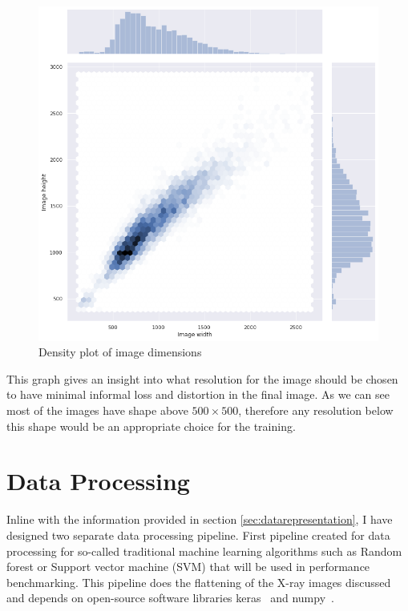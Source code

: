 \begin{figure}[H]
    \centering
    \includegraphics[width=\textwidth]{img/image_dims_density.png}
    \caption{Density plot of image dimensions}
    \label{fig:imagedimensions}
\end{figure}

This graph gives an insight into what resolution for the image should be chosen to have minimal informal loss and distortion in the final image. As we can see most of the images have shape above $500 \times 500$, therefore any resolution below this shape would be an appropriate choice for the training. 

\section{Data Processing} \label{sec:dataprocessing}
Inline with the information provided in section \ref{sec:datarepresentation}, I have designed two separate data processing pipeline.
First pipeline created for data processing for so-called traditional machine learning algorithms such as Random forest or Support vector machine (SVM) that will be used in performance benchmarking.
This pipeline does the flattening of the X-ray images discussed and depends on open-source software libraries keras~\cite{keras} and numpy~\cite{numpy}.

